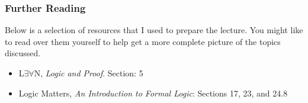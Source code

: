 \documentclass{beamer}
\theoremstyle{indentDefn} \newtheorem{defn}[]{Definition}
\begin{document}
\begin{frame}
  \frametitle{Further Reading}


Below is a selection of resources that I used to prepare the lecture. You might like to read over them yourself to help get a more complete picture of the topics discussed. 

\vspace{0.5cm}

\begin{itemize}
	\item L$\exists \forall$N, \emph{Logic and Proof}. Section: 5  
	\item Logic Matters, \emph{An Introduction to Formal Logic}: Sections 17, 23, and 24.8
\end{itemize}


\end{frame}
\end{document}

